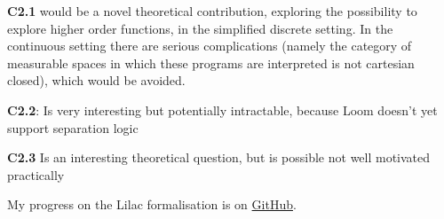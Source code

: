 \textbf{C2.1} would be a novel theoretical contribution, exploring the possibility to explore higher order functions, in the simplified discrete setting.
In the continuous setting there are serious complications (namely the category of measurable spaces in which these programs are interpreted is not cartesian closed),
which would be avoided. 

\textbf{C2.2}: Is very interesting but potentially intractable, because Loom doesn't yet support separation logic

\textbf{C2.3} Is an interesting theoretical question, but is possible not well motivated practically

 My progress on the Lilac formalisation is on \href{https://github.com/edwin1729/bppl-logic}{GitHub}.






